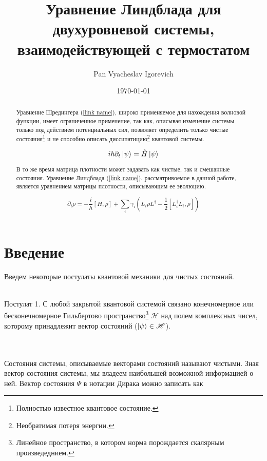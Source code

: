 \documentclass[a4paper, 10pt]{article}
\title{Уравнение Линдблада для двухуровневой системы, взаимодействующей с термостатом}
\author{Pan Vyacheslav Igorevich}
\date{\today}
\begin{document}
\maketitle
    \begin{abstract}
        Уравнение Шредингера (\ref{link name}), широко применяемое для нахождения волновой функции, имеет ограниченное применение, 
        так как, описывая изменение системы только под действием потенциальных сил, позволяет определить только чистые 
        состояния\footnote{Полностью известное квантовое состояние.} и не способно описать диссипатицию\footnote{Необратимая потеря энергии.}
        квантовой системы.

        \begin{equation} \label{link name}
            i\hbar\partial_{t} \ket{\psi} = \hat{H}\ket{\psi}
        \end{equation}

        В то же время матрица плотности может задавать как чистые, так и смешанные состояния. Уравнение Линдблада
        (\ref{link name}), рассматривоемое в данной работе, является уравнением матрицы плотности, описывающим ее эволюцию.

        \begin{equation}\label{link name}
            \partial_t \rho = -\frac{i}{\hbar} [H,\rho] + \sum_i \gamma_i ( L_{i} \rho L^{\dagger} - \frac{1}{2} [L_{i}^{\dagger} L_i , \rho]) 
        \end{equation}

    \end{abstract}

    \section{Введение}
        Введем некоторые постулаты квантовой механики для чистых состояний.
        \\ \\
        \begin{itshape}
            \centering Постулат 1. С любой закрытой квантовой системой связано конечномерное или бесконечномерное 
            Гильбертово пространство\footnote{Линейное пространство, в котором норма порождается скалярным произведеднием.} $\mathscr{H}$ 
            над полем комплексных чисел, 
            которому принадлежит вектор состояний ($\ket{\psi} \in \mathscr{H}$).
        \end{itshape}
        \\ \\
        Состояния системы, описываемые векторами состояний называют чистыми. Зная вектор состояния системы, мы владеем наибольшей возможной 
        информацией о ней.
        Вектор состояния $\Psi$ в нотации Дирака можно записать как 
     
\end{document}

